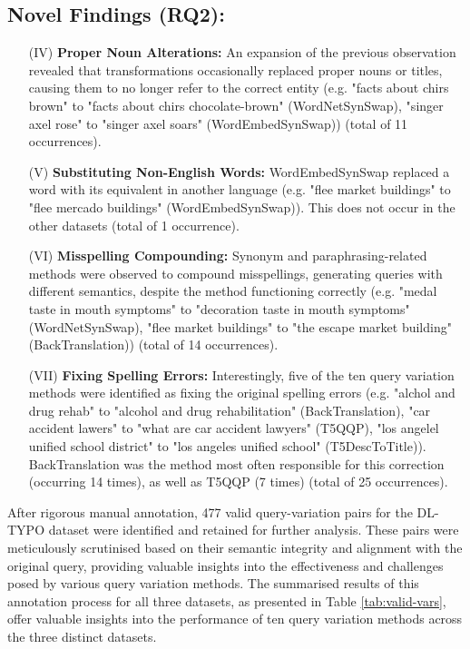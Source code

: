 \subsection{Novel Findings (RQ2):} \label{sec:novelFindings}
\begin{itemize}
    \item[(IV)] \textbf{Proper Noun Alterations:} An expansion of the previous observation revealed that transformations occasionally replaced proper nouns or titles, causing them to no longer refer to the correct entity (e.g. "facts about chirs brown" to "facts about chirs chocolate-brown" (WordNetSynSwap), "singer axel rose" to "singer axel soars" (WordEmbedSynSwap)) (total of 11 occurrences).
    \item[(V)] \textbf{Substituting Non-English Words:} WordEmbedSynSwap replaced a word with its equivalent in another language (e.g. "flee market buildings" to "flee mercado buildings" (WordEmbedSynSwap)). This does not occur in the other datasets (total of 1 occurrence).
    \item[(VI)] \textbf{Misspelling Compounding:} Synonym and paraphrasing-related methods were observed to compound misspellings, generating queries with different semantics, despite the method functioning correctly (e.g. "medal taste in mouth symptoms" to "decoration taste in mouth symptoms" (WordNetSynSwap), "flee market buildings" to "the escape market building" (BackTranslation)) (total of 14 occurrences).
    \item[(VII)] \textbf{Fixing Spelling Errors:} Interestingly, five of the ten query variation methods were identified as fixing the original spelling errors (e.g. "alchol and drug rehab" to "alcohol and drug rehabilitation" (BackTranslation), "car accident lawers" to "what are car accident lawyers" (T5QQP), "los angelel unified school district" to "los angeles unified school" (T5DescToTitle)). BackTranslation was the method most often responsible for this correction (occurring 14 times), as well as T5QQP (7 times) (total of 25 occurrences). 
\end{itemize}



After rigorous manual annotation, 477 valid query-variation pairs for the DL-TYPO dataset were identified and retained for further analysis. These pairs were meticulously scrutinised based on their semantic integrity and alignment with the original query, providing valuable insights into the effectiveness and challenges posed by various query variation methods. The summarised results of this annotation process for all three datasets, as presented in Table \ref{tab:valid-vars}, offer valuable insights into the performance of ten query variation methods across the three distinct datasets.

